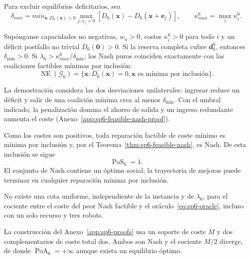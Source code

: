 Para excluir equilibrios deficitarios, sea
\begin{equation}
\label{eq:sp6-delta-min}
 \delta_{min}=min_{\boldsymbol x:D_6(\boldsymbol x)>0}
 \max_{j:x_j=0}\left[D_6(\boldsymbol x)-D_6(\boldsymbol x+\boldsymbol e_j)\right],
 \qquad
 \kappa_{max}^6=\max_i\kappa_i^6.
\end{equation}

\begin{teorema}
\label{thm:sp6-feasible-nash}
Supónganse capacidades no negativas, $w_a>0$, costes $\kappa_i^6>0$ para todo $i$ y un déficit postfallo no trivial $D_6(\boldsymbol0)>0$. Si la reserva completa cubre $\boldsymbol d_k^6$, entonces $\delta_{\min}>0$. Si $\lambda_6>\kappa_{max}^6/\delta_{\min}$, los Nash puros coinciden exactamente con las coaliciones factibles mínimas por inclusión:
\[
 \operatorname{NE}(\mathcal G_6)=
 \{\boldsymbol x:D_6(\boldsymbol x)=0,
   \boldsymbol x\text{ es mínima por inclusión}\}.
\]
\end{teorema}

La demostración considera las dos desviaciones unilaterales: ingresar reduce un déficit y salir de una coalición mínima crea al menos $\delta_{\min}$. Con el umbral indicado, la penalización domina el ahorro de salida y un ingreso redundante aumenta el coste (Anexo~\ref{app:sp6-feasible-nash-proof}).

Como los costes son positivos, toda reparación factible de coste mínimo es mínima por inclusión y, por el Teorema~\ref{thm:sp6-feasible-nash}, es Nash. De esta inclusión se sigue
\begin{equation}
 \operatorname{PoS}_6=1.
 \label{eq:sp6-pos}
\end{equation}
El conjunto de Nash contiene un óptimo social; la trayectoria de mejoras puede terminar en cualquier reparación mínima por inclusión.

\begin{proposicion}
\label{prop:sp6-unbounded-poa}
No existe una cota uniforme, independiente de la instancia y de $\lambda_6$, para el cociente entre el coste del peor Nash factible y el oráculo~\eqref{eq:sp6-oracle}, incluso con un solo recurso y tres robots.
\end{proposicion}

La construcción del Anexo~\ref{app:sp6-proofs} usa un soporte de coste $M$ y dos complementarios de coste total dos. Ambos son Nash y el cociente $M/2$ diverge, de donde $\operatorname{PoA}_6=+\infty$ aunque exista un equilibrio óptimo.

